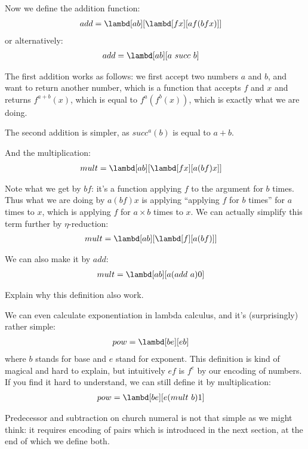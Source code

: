\documentclass[../../../include/open-logic-section]{subfiles}
\begin{document}
Now we define the addition function:
\begin{align*}
  {add} &= \lambd[{a}{b}][\lambd[fx][{a} f ({b} f x)]]
\end{align*}
or alternatively:
\begin{align*}
  {add} &= \lambd[{a}{b}][{a} ~ {succ} ~ {b}]
\end{align*}

The first addition works as follows: we first accept two numbers ${a}$ and
${b}$, and want to return another number, which is a function that accepts
$f$ and $x$ and returns $f^{a+b}(x)$, which is equal to
$f^{a}(f^{b}(x))$, which is exactly what we are doing.

The second addition is simpler, as $succ^a(b)$ is equal to ${a + b}$.

And the multiplication:
\begin{align*}
  {mult} &= \lambd[{a}{b}][\lambd[fx][{a} ({b} f) x]]
\end{align*}

Note what we get by ${b} f$: it's a function applying $f$
to the argument for $b$ times. Thus what we are doing by ${a} ({b} f) x$ is applying ``applying
$f$ for $b$ times'' for $a$ times to $x$, which is applying $f$ for $a
\times b$ times to $x$. We can actually simplify this term further by
$\eta$-reduction:
\begin{align*}
  {mult} &= \lambd[ab][\lambd[f][a (b f)]]
\end{align*}

We can also make it by $add$:
\begin{align*}
  {mult} &= \lambd[ab][a (add ~ a) 0]
\end{align*}

\begin{prob}
  Explain why this definition also work.
\end{prob}

We can even calculate exponentiation in lambda calculus, and it's
(surprisingly) rather simple:
\begin{align*}
  {pow} &= \lambd[be][e b]
\end{align*}
where $b$ stands for base and $e$ stand for exponent. 
This definition is kind of magical and hard to explain, but
intuitively $e f$ is $f^e$ by our encoding of numbers. If you find it
hard to understand, we can still define it by multiplication:
\begin{align*}
  {pow} &= \lambd[be][e ({mult}~ b) 1]
\end{align*}

Predecessor and subtraction on church numeral is not that simple as we might think: it
requires encoding of pairs which is introduced in the next section,
at the end of which we define both.
\end{document}
